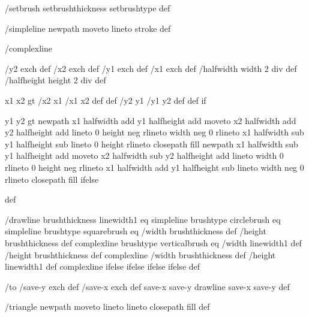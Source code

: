 /setbrush { setbrushthickness setbrushtype } def

/simpleline { newpath moveto lineto stroke } def

/complexline
  { /y2 exch def /x2 exch def
    /y1 exch def /x1 exch def
    /halfwidth width 2 div def
    /halfheight height 2 div def

    x1 x2 gt { /x2 x1 /x1 x2 def def /y2 y1 /y1 y2 def def } if

    y1 y2 gt
     { %
       newpath
        x1 halfwidth add y1 halfheight add moveto
	x2 halfwidth add y2 halfheight add lineto
	0 height neg rlineto
        width neg 0 rlineto
        x1 halfwidth sub y1 halfheight sub lineto
        0 height rlineto
        closepath
	fill }
     { %
       newpath
        x1 halfwidth sub y1 halfheight add moveto
	x2 halfwidth sub y2 halfheight add lineto
	width 0 rlineto
	0 height neg rlineto
	x1 halfwidth add y1 halfheight sub lineto
	width neg 0 rlineto
	closepath
	fill }
     ifelse } def

/drawline
  { brushthickness linewidth1 eq
    { simpleline }
    { brushtype circlebrush eq
       { %
         simpleline }
       { brushtype squarebrush eq
          { %
            /width brushthickness def
	    /height brushthickness def
	    complexline }
          { brushtype verticalbrush eq
             { %
	       /width linewidth1 def
	       /height brushthickness def
	       complexline }
             { %
	       /width brushthickness def
	       /height linewidth1 def
	       complexline }
             ifelse }
          ifelse }
       ifelse }
    ifelse } def

/to
 { /save-y exch def
   /save-x exch def
   save-x save-y drawline
   save-x save-y } def

/triangle
 { newpath moveto lineto lineto closepath fill } def

